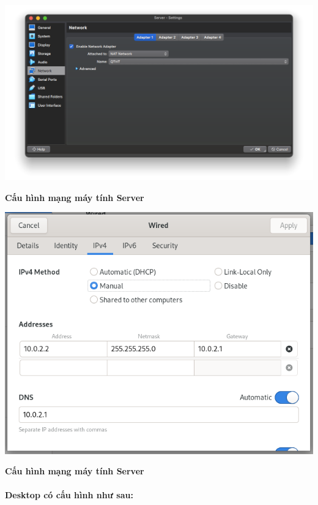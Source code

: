 \begin{minipage}{.93\linewidth}
  \captionsetup{type=figure}
  \includegraphics[width=\linewidth]{./imgs/Hinh-6.png}
  \caption{\bfseries Cấu hình mạng máy tính Server}
  \label{fig:server-network-1}
\end{minipage}


\begin{minipage}{.93\linewidth}
  \captionsetup{type=figure}
  \includegraphics[width=\linewidth]{./imgs/Hinh-7.png}
  \caption{\bfseries Cấu hình mạng máy tính Server}
  \label{fig:server-network-2}
\end{minipage}


\paragraph{Desktop có cấu hình như sau:}


